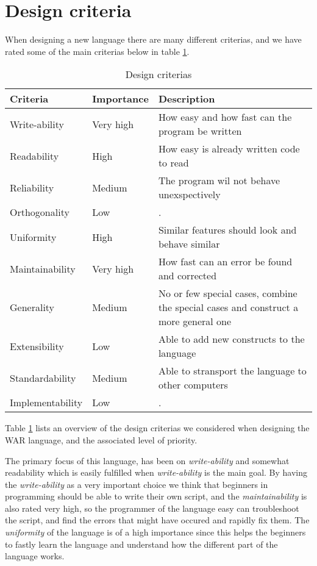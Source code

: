 
\section{Design criteria}

When designing a new language there are many different criterias, and we have rated some of the main criterias below in table \ref{tab:criteria_tabular}. 

%

\begin{table}[H]
	\begin{tabular}{| 	l	|	 l	| p{7cm}	|}
	\hline
	Criteria			&	Importance	&		Description	\\	
	\hline
	
	
		
	Write-ability 		& 	Very high	&		How easy and how fast can the program be written\\
	Readability			& 	High		&		How easy is already written code to read\\
	Reliability			& 	Medium		&		The program wil not behave unexspectively\\
	Orthogonality		& 	Low			&		.\\
	Uniformity			& 	High		&		Similar features should look and behave similar\\
	Maintainability		& 	Very high	&		How fast can an error be found and corrected\\
	Generality			& 	Medium		&		No or few special cases, combine the special cases and construct a more general one\\
	Extensibility		& 	Low			&		Able to add new constructs to the language\\
	Standardability		& 	Medium		&		Able to stransport the language to other computers\\
	Implementability	& 	Low			&		.\\
	\hline
	\end{tabular}
	\caption{Design criterias}
	\label{tab:criteria_tabular}
\end{table}


Table \ref{tab:criteria_tabular} lists an overview of the design criterias we considered when designing the WAR language, and the associated level of priority.

The primary focus of this language, has been on \textit{write-ability} and somewhat readability which is easily fulfilled when \textit{write-ability} is the main goal. By having the \textit{write-ability} as a very important choice we think that beginners in programming should be able to write their own script, and the \textit{maintainability} is also rated very high, so the programmer of the language easy can troubleshoot the script, and find the errors that might have occured and rapidly fix them. The \textit{uniformity} of the language is of a high importance since this helps the beginners to fastly learn the language and understand how the different part of the language works.


